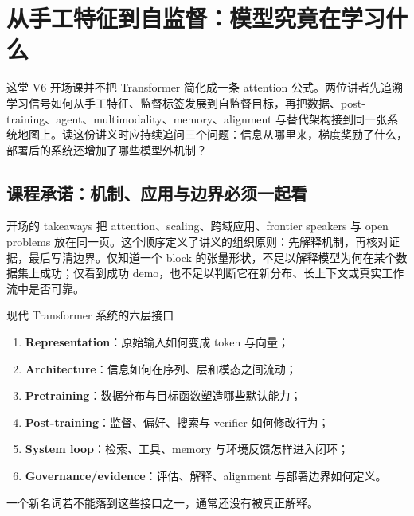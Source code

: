 \section{从手工特征到自监督：模型究竟在学习什么}

这堂 V6 开场课并不把 Transformer 简化成一条 attention 公式。两位讲者先追溯学习信号如何从手工特征、监督标签发展到自监督目标，再把数据、post-training、agent、multimodality、memory、alignment 与替代架构接到同一张系统地图上。读这份讲义时应持续追问三个问题：信息从哪里来，梯度奖励了什么，部署后的系统还增加了哪些模型外机制？

\subsection{课程承诺：机制、应用与边界必须一起看}

开场的 takeaways 把 attention、scaling、跨域应用、frontier speakers 与 open problems 放在同一页。这个顺序定义了讲义的组织原则：先解释机制，再核对证据，最后写清边界。仅知道一个 block 的张量形状，不足以解释模型为何在某个数据集上成功；仅看到成功 demo，也不足以判断它在新分布、长上下文或真实工作流中是否可靠。



\begin{importantbox}{现代 Transformer 系统的六层接口}
\begin{enumerate}
  \item \textbf{Representation}：原始输入如何变成 token 与向量；
  \item \textbf{Architecture}：信息如何在序列、层和模态之间流动；
  \item \textbf{Pretraining}：数据分布与目标函数塑造哪些默认能力；
  \item \textbf{Post-training}：监督、偏好、搜索与 verifier 如何修改行为；
  \item \textbf{System loop}：检索、工具、memory 与环境反馈怎样进入闭环；
  \item \textbf{Governance/evidence}：评估、解释、alignment 与部署边界如何定义。
\end{enumerate}
一个新名词若不能落到这些接口之一，通常还没有被真正解释。
\end{importantbox}

